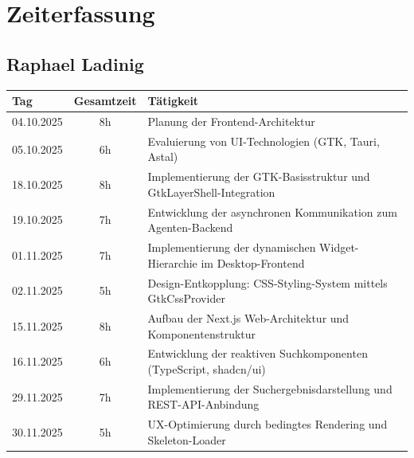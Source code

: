 \chapter{Zeiterfassung}

\section{Raphael Ladinig}

\begin{table}[H]
	\centering
	\scriptsize
	\begin{tabular}{|l|c|p{8.5cm}|}
		\hline
		Tag                                        & Gesamtzeit    & Tätigkeit                                                                    \\
		\hline
		04.10.2025                                 & 8h            & Planung der Frontend-Architektur                                             \\
		05.10.2025                                 & 6h            & Evaluierung von UI-Technologien (GTK, Tauri, Astal)                          \\
		18.10.2025                                 & 8h            & Implementierung der GTK-Basisstruktur und GtkLayerShell-Integration          \\
		19.10.2025                                 & 7h            & Entwicklung der asynchronen Kommunikation zum Agenten-Backend                 \\
		01.11.2025                                 & 7h            & Implementierung der dynamischen Widget-Hierarchie im Desktop-Frontend        \\
		02.11.2025                                 & 5h            & Design-Entkopplung: CSS-Styling-System mittels GtkCssProvider                \\
		15.11.2025                                 & 8h            & Aufbau der Next.js Web-Architektur und Komponentenstruktur                   \\
		16.11.2025                                 & 6h            & Entwicklung der reaktiven Suchkomponenten (TypeScript, shadcn/ui)           \\
		29.11.2025                                 & 7h            & Implementierung der Suchergebnisdarstellung und REST-API-Anbindung           \\
		30.11.2025                                 & 5h            & UX-Optimierung durch bedingtes Rendering und Skeleton-Loader                 \\

\end{tabular}
\end{table}
